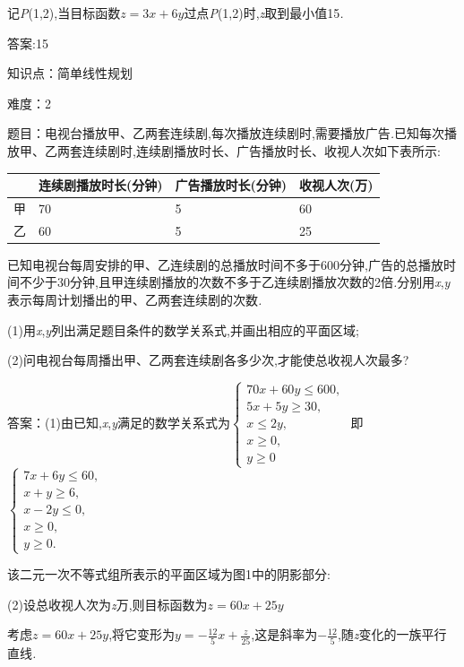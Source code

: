 \documentclass{article} %
\begin{document}
记\textit{P}(1,2),当目标函数$z=3x+6y$过点\textit{P}(1,2)时,\textit{z}取到最小值15\textit{.}

 答案:15


知识点：简单线性规划

难度：2

题目：电视台播放甲、乙两套连续剧,每次播放连续剧时,需要播放广告\textit{.}已知每次播放甲、乙两套连续剧时,连续剧播放时长、广告播放时长、收视人次如下表所示:

\begin{tabular}{|p{0.2in}|p{1.3in}|p{1.1in}|p{0.7in}|} \hline 
	& 连续剧播放时长\newline (分钟) & 广告播放时长\newline (分钟) & 收视人次\newline (万) \\ \hline 
	甲 & 70 & 5 & 60 \\ \hline 
	乙 & 60 & 5 & 25 \\ \hline 
\end{tabular}



 已知电视台每周安排的甲、乙连续剧的总播放时间不多于600分钟,广告的总播放时间不少于30分钟,且甲连续剧播放的次数不多于乙连续剧播放次数的2倍\textit{.}分别用\textit{x},\textit{y}表示每周计划播出的甲、乙两套连续剧的次数\textit{.}

 (1)用\textit{x},\textit{y}列出满足题目条件的数学关系式,并画出相应的平面区域;

 (2)问电视台每周播出甲、乙两套连续剧各多少次,才能使总收视人次最多?

 答案：(1)由已知,\textit{x},\textit{y}满足的数学关系式为$
\begin{cases}
70x+60y\le 600,\\
5x+5y \ge 30,\\
x \le 2y,\\
x\ge 0,\\
y \ge 0
\end{cases}$
即
$
\begin{cases}
7x+6y \le 60,\\
x+y \ge 6,\\
x-2y \le 0,\\
x \ge 0,\\
y \ge 0.
\end{cases}$

 该二元一次不等式组所表示的平面区域为图1中的阴影部分:

(2)设总收视人次为\textit{z}万,则目标函数为$z=60x+25y$

考虑$z=60x+25y$,将它变形为$y=-\frac{12}{5}x+\frac{z}{25}$,这是斜率为$-\frac{12}{5}$,随\textit{z}变化的一族平行直线\textit{.}
\end{document}
